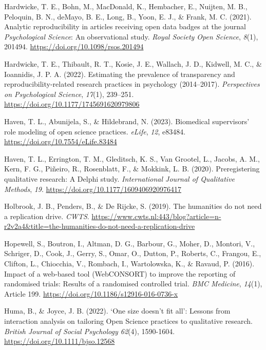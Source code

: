 \documentclass[authordate, meta]{jote-new-article}
\begin{document}
	Hardwicke, T. E., Bohn, M., MacDonald, K., Hembacher, E., Nuijten, M. B., Peloquin, B. N., deMayo, B. E., Long, B., Yoon, E. J., \& Frank, M. C. (2021). Analytic reproducibility in articles receiving open data badges at the journal \emph{Psychological Science}: An observational study. \emph{Royal Society Open Science}, \emph{8}(1), 201494. \url{https://doi.org/10.1098/rsos.201494}



	Hardwicke, T. E., Thibault, R. T., Kosie, J. E., Wallach, J. D., Kidwell, M. C., \& Ioannidis, J. P. A. (2022). Estimating the prevalence of transparency and reproducibility-related research practices in psychology (2014--2017). \emph{Perspectives on Psychological Science}, \emph{17}(1), 239--251. \url{https://doi.org/10.1177/1745691620979806}



	Haven, T. L., Abunijela, S., \& Hildebrand, N. (2023). Biomedical supervisors' role modeling of open science practices. \emph{eLife}, \emph{12}, e83484. \url{https://doi.org/10.7554/eLife.83484}



	Haven, T. L., Errington, T. M., Gleditsch, K. S., Van Grootel, L., Jacobs, A. M., Kern, F. G., Piñeiro, R., Rosenblatt, F., \& Mokkink, L. B. (2020). Preregistering qualitative research: A Delphi study. \emph{International Journal of Qualitative Methods}, \emph{19}. \url{https://doi.org/10.1177/1609406920976417}



	Holbrook, J. B., Penders, B., \& De Rijcke, S. (2019). The humanities do not need a replication drive. \emph{CWTS}. \url{https://www.cwts.nl:443/blog?article=n-r2v2a4\&title=the-humanities-do-not-need-a-replication-drive}



	Hopewell, S., Boutron, I., Altman, D. G., Barbour, G., Moher, D., Montori, V., Schriger, D., Cook, J., Gerry, S., Omar, O., Dutton, P., Roberts, C., Frangou, E., Clifton, L., Chiocchia, V., Rombach, I., Wartolowska, K., \& Ravaud, P. (2016). Impact of a web-based tool (WebCONSORT) to improve the reporting of randomised trials: Results of a randomised controlled trial. \emph{BMC Medicine}, \emph{14}(1), Article 199. \url{https://doi.org/10.1186/s12916-016-0736-x}



	Huma, B., \& Joyce, J. B. (2022). ‘One size doesn't fit all': Lessons from interaction analysis on tailoring Open Science practices to qualitative research. \emph{British Journal of Social Psychology 62}(4), 1590-1604. \url{https://doi.org/10.1111/bjso.12568}
\end{document}
